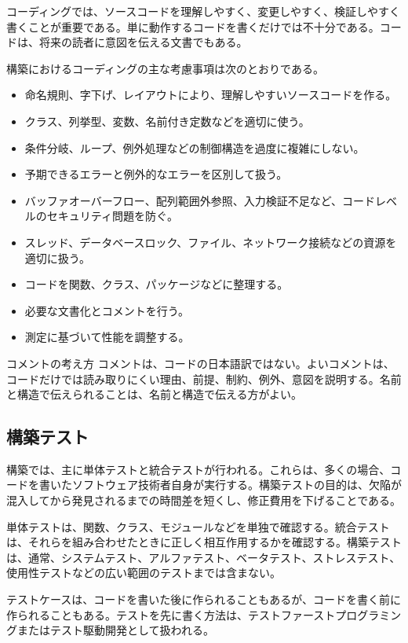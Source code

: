 \documentclass[a4paper,11pt,ja=standard,xelatex]{bxjsarticle}
\begin{document}
コーディングでは、ソースコードを理解しやすく、変更しやすく、検証しやすく書くことが重要である。単に動作するコードを書くだけでは不十分である。コードは、将来の読者に意図を伝える文書でもある。

構築におけるコーディングの主な考慮事項は次のとおりである。

\begin{itemize}
  \item 命名規則、字下げ、レイアウトにより、理解しやすいソースコードを作る。
  \item クラス、列挙型、変数、名前付き定数などを適切に使う。
  \item 条件分岐、ループ、例外処理などの制御構造を過度に複雑にしない。
  \item 予期できるエラーと例外的なエラーを区別して扱う。
  \item バッファオーバーフロー、配列範囲外参照、入力検証不足など、コードレベルのセキュリティ問題を防ぐ。
  \item スレッド、データベースロック、ファイル、ネットワーク接続などの資源を適切に扱う。
  \item コードを関数、クラス、パッケージなどに整理する。
  \item 必要な文書化とコメントを行う。
  \item 測定に基づいて性能を調整する。
\end{itemize}

\begin{keybox}{コメントの考え方}
コメントは、コードの日本語訳ではない。よいコメントは、コードだけでは読み取りにくい理由、前提、制約、例外、意図を説明する。名前と構造で伝えられることは、名前と構造で伝える方がよい。
\end{keybox}

\subsection{構築テスト}

構築では、主に単体テストと統合テストが行われる。これらは、多くの場合、コードを書いたソフトウェア技術者自身が実行する。構築テストの目的は、欠陥が混入してから発見されるまでの時間差を短くし、修正費用を下げることである。

単体テストは、関数、クラス、モジュールなどを単独で確認する。統合テストは、それらを組み合わせたときに正しく相互作用するかを確認する。構築テストは、通常、システムテスト、アルファテスト、ベータテスト、ストレステスト、使用性テストなどの広い範囲のテストまでは含まない。

テストケースは、コードを書いた後に作られることもあるが、コードを書く前に作られることもある。テストを先に書く方法は、テストファーストプログラミングまたはテスト駆動開発として扱われる。
\end{document}
